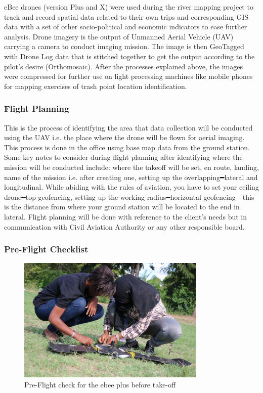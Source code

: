 \documentclass[a4paper,12pt,twoside]{article}
\begin{document}
    \begin{multicols}{2}
        eBee drones (version Plus and X) were used during the river mapping project to track and record spatial data related to their own trips and corresponding GIS data with a set of other socio-political and economic indicators to ease further analysis. Drone imagery is the output of Unmanned Aerial Vehicle (UAV) carrying a camera to conduct imaging mission. The image is then GeoTagged with Drone Log data that is stitched together to get the output according to the pilot’s desire (Orthomosaic). After the processes explained above, the images were compressed for further use on light processing machines like mobile phones for mapping exercises of trash point location identification.
    \end{multicols}
    
    \subsubsection{Flight Planning}
        This is the process of identifying the area that data collection will be conducted using the UAV i.e. the place where the drone will be flown for aerial imaging. This process is done in the office using base map data from the ground station. Some key notes to consider during flight planning after identifying where the mission will be conducted include: where the takeoff will be set, en route, landing, name of the mission i.e. after creating one, setting up the overlapping━lateral and longitudinal. While abiding with the rules of aviation, you have to set your ceiling drone━top geofencing, setting up the working radius━horizontal geofencing---this is the distance from where your ground station will be located to the end in lateral. Flight planning will be done with reference to the client’s needs but in communication with Civil Aviation Authority or any other responsible board.
    
    \subsubsection{Pre-Flight Checklist}
    
         \begin{figure} %
            \centering
            \includegraphics[width=0.8\textwidth]{images/image18.jpg}
            \caption{Pre-Flight check for the ebee plus before take-off}
        \end{figure}
    
\end{document}
